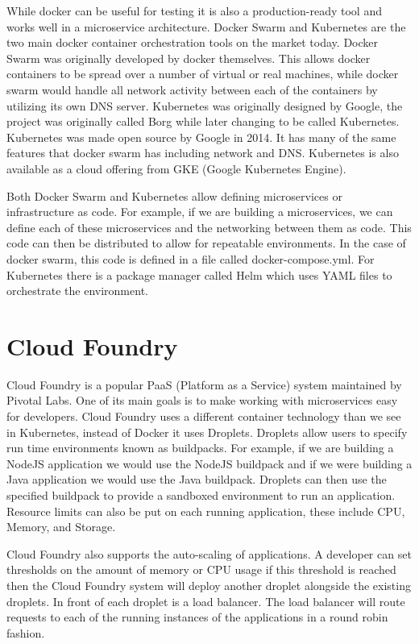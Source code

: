 While docker can be useful for testing it is also a production-ready tool and works well in a microservice architecture. Docker Swarm and Kubernetes are the two main docker container orchestration tools on the market today. Docker Swarm was originally developed by docker themselves. This allows docker containers to be spread over a number of virtual or real machines, while docker swarm would handle all network activity between each of the containers by utilizing its own DNS server. Kubernetes was originally designed by Google, the project was originally called Borg while later changing to be called Kubernetes. Kubernetes was made open source by Google in 2014. It has many of the same features that docker swarm has including network and DNS. Kubernetes is also available as a cloud offering from GKE (Google Kubernetes Engine). 

Both Docker Swarm and Kubernetes allow defining microservices or infrastructure as code. For example, if we are building a microservices, we can define each of these microservices and the networking between them as code. This code can then be distributed to allow for repeatable environments. In the case of docker swarm, this code is defined in a file called docker-compose.yml. For Kubernetes there is a package manager called Helm which uses YAML files to orchestrate the environment.

\section{Cloud Foundry}

Cloud Foundry is a popular PaaS (Platform as a Service) system maintained by Pivotal Labs. One of its main goals is to make working with microservices easy for developers. Cloud Foundry uses a different container technology than we see in Kubernetes, instead of Docker it uses Droplets. Droplets allow users to specify run time environments known as buildpacks. For example, if we are building a NodeJS application we would use the NodeJS buildpack and if we were building a Java application we would use the Java buildpack. Droplets can then use the specified buildpack to provide a sandboxed environment to run an application. Resource limits can also be put on each running application, these include CPU, Memory, and Storage.

Cloud Foundry also supports the auto-scaling of applications. A developer can set thresholds on the amount of memory or CPU usage if this threshold is reached then the Cloud Foundry system will deploy another droplet alongside the existing droplets. In front of each droplet is a load balancer. The load balancer will route requests to each of the running instances of the applications in a round robin fashion.

